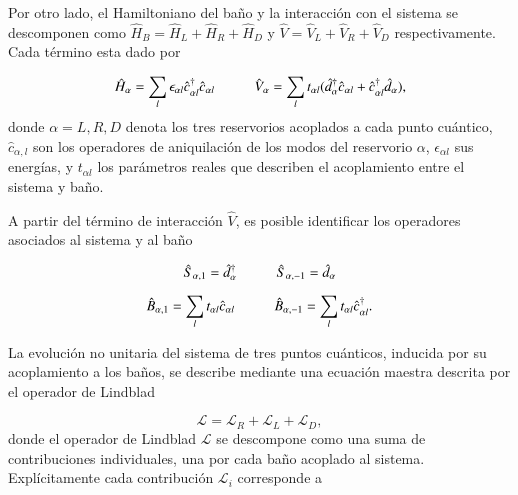 Por otro lado, el Hamiltoniano del baño y la interacción con el sistema se descomponen como $\hat{H}_{B} = \hat{H}_{L}+\hat{H}_{R}+\hat{H}_{D}$ y $\hat{V} = \hat{V}_{L}+\hat{V}_{R}+\hat{V}_{D}$ respectivamente. Cada término esta dado por 

\begin{equation*}
    \hat{H}_{\alpha} = \sum_{l} \epsilon_{\alpha l} \hat{c}^{\dagger}_{\alpha l}\hat{c}_{\alpha l} \hspace{10mm} \hat{V}_{\alpha} = \sum_{l} t_{\alpha l} ( \hat{d}^{\dagger}_{\alpha} \hat{c}_{\alpha l} + \hat{c}^{\dagger}_{\alpha l} \hat{d}_{\alpha} ),
\end{equation*}
donde $\alpha = L,R,D$ denota los tres reservorios acoplados a cada punto cuántico, $\hat{c}_{\alpha,l}$ son los operadores de aniquilación de los modos del reservorio $\alpha$, $\epsilon_{\alpha l}$ sus energías, y $t_{\alpha l}$ los parámetros reales que describen el acoplamiento entre el sistema y baño. 

A partir del término de interacción $\hat{V}$, es posible identificar los operadores asociados al sistema y al baño

\begin{equation*}
    \hat{S}_{\alpha,1} = \hat{d}^{\dagger}_{\alpha} \hspace{10mm} \hat{S}_{\alpha,-1} = \hat{d}_{\alpha}
\end{equation*}

\begin{equation*}
    \hat{B}_{\alpha,1} = \sum_{l}t_{\alpha l} \hat{c}_{\alpha l} \hspace{10mm} \hat{B}_{\alpha,-1} = \sum_{l}t_{\alpha l} \hat{c}^{\dagger}_{\alpha l}.
\end{equation*}

La evolución no unitaria del sistema de tres puntos cuánticos, inducida por su acoplamiento a los baños, se describe mediante una ecuación maestra descrita por el operador de Lindblad

\begin{equation}
    \mathcal{L} = \mathcal{L}_{R} + \mathcal{L}_{L} + \mathcal{L}_{D},
    \label{Lindbladsec5}
\end{equation}
donde el operador de Lindblad $\mathcal{L}$ se descompone como una suma de contribuciones individuales, una por cada baño acoplado al sistema. Explícitamente cada contribución $\mathcal{L}_{i}$ corresponde a 

